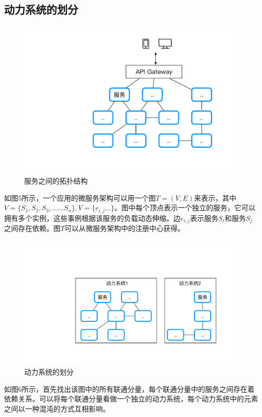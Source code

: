 \documentclass[10.5pt,twocolumn]{jbuaa}
\begin{document}
\subsection{动力系统的划分}
\begin{figure}[H]
\centering
\includegraphics [scale=0.4,trim=0 0 0 0]{./image/5.pdf}
\caption{服务之间的拓扑结构}
\end{figure}
如图5所示，一个应用的微服务架构可以用一个图$T=(V,E)$来表示，其中$V=\{S_1,S_2,S_3,......S_n\}, V=\{e_{i,j}...\}$。图中每个顶点表示一个独立的服务，它可以拥有多个实例，这些事例根据该服务的负载动态伸缩。边$e_{i,j}$表示服务$S_i$和服务$S_j$之间存在依赖。图$T$可以从微服务架构中的注册中心获得。
\begin{figure}[H]
\centering
\includegraphics [scale=0.4,trim=0 0 0 0]{./image/6.pdf}
\caption{动力系统的划分}
\end{figure}

如图6所示，首先找出该图中的所有联通分量，每个联通分量中的服务之间存在着依赖关系。可以将每个联通分量看做一个独立的动力系统，每个动力系统中的元素之间以一种混沌的方式互相影响。
\end{document}
